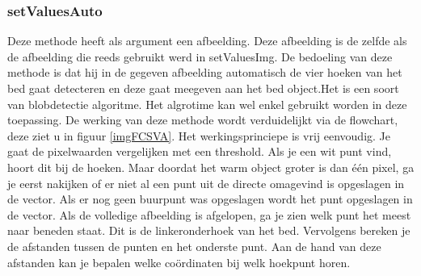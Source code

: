 \subsubsection{setValuesAuto}
Deze methode heeft als argument een afbeelding. Deze afbeelding is de zelfde als de afbeelding die reeds gebruikt werd in setValuesImg. De bedoeling van deze methode is dat hij in de gegeven afbeelding automatisch de vier hoeken van het bed gaat detecteren en deze gaat meegeven aan het bed object.Het is een soort van blobdetectie algoritme. Het algrotime kan wel enkel gebruikt worden in deze toepassing. De werking van deze methode wordt verduidelijkt via de flowchart, deze ziet u in figuur \ref{imgFCSVA}. Het werkingsprinciepe is vrij eenvoudig. Je gaat de pixelwaarden vergelijken met een threshold. Als je een wit punt vind, hoort dit bij de hoeken. Maar doordat het warm object groter is dan \'e\'en pixel, ga je eerst nakijken of er niet al een punt uit de directe omagevind is opgeslagen in de vector. Als er nog geen buurpunt was opgeslagen wordt het punt opgeslagen in de vector. Als de volledige afbeelding is afgelopen, ga je zien welk punt het meest naar beneden staat. Dit is de linkeronderhoek van het bed. Vervolgens bereken je de afstanden tussen de punten en het onderste punt. Aan de hand van deze afstanden kan je bepalen welke co\"ordinaten bij welk hoekpunt horen.
